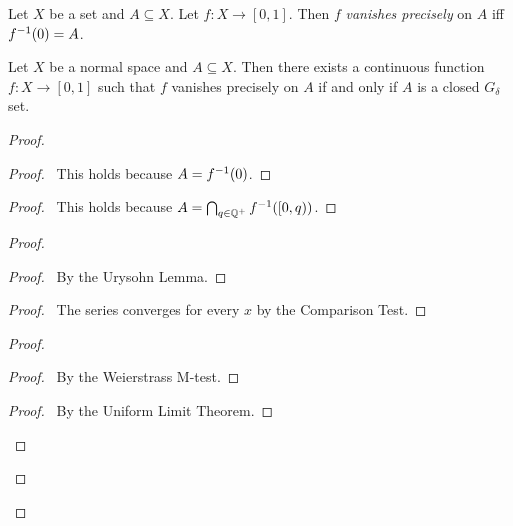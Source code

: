  \begin{df}
Let $X$ be a set and $A \subseteq X$. Let $f : X \rightarrow [0,1]$. Then $f$
\emph{vanishes precisely} on $A$ iff ${f}^{-1}(0) = A$.
\end{df}

\begin{thm}[CC]
  \label{thm:topology:normal:vanishes_precisely}
Let $X$ be a normal space and $A \subseteq X$. Then there exists a continuous
function $f : X \rightarrow [0,1]$ such that $f$ vanishes precisely on $A$ if
and only if $A$ is a closed $G_\delta$ set.
\end{thm}

\begin{proof}
\pf
{}
\begin{proof}
  \pf\ This holds because $A = {f}^{-1}(0)$.
\end{proof}
\begin{proof}
  \pf\ This holds because $A = \bigcap_{q \in \mathbb{Q}^+} {f}^{-1}([0, q))$.
\end{proof}
\begin{proof}
  \begin{proof}
    \pf\ By the Urysohn Lemma.
  \end{proof}
  \begin{proof}
    \pf\ The series converges for every $x$ by the Comparison Test.
  \end{proof}
  \begin{proof}
    \begin{proof}
      \pf\ By the Weierstrass M-test.
    \end{proof}
    \qedstep
    \begin{proof}
      \pf\ By the Uniform Limit Theorem.
    \end{proof}
  \end{proof}

\end{proof}
\end{proof}
